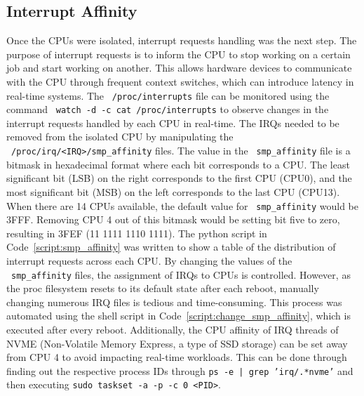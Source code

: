 \documentclass[MMR,Master,english]{twbook}
\begin{document}
\subsection{Interrupt Affinity}\label{subsec:irq_handling}
Once the CPUs were isolated, interrupt requests handling was the next step. The purpose of interrupt requests is to inform the CPU to stop working on a certain job and start working on another. This allows hardware devices to communicate with the CPU through frequent context switches, which can introduce latency in real-time systems. The ~\texttt{/proc/interrupts} file can be monitored using the command ~\texttt{watch -d -c cat /proc/interrupts} to observe changes in the interrupt requests handled by each CPU in real-time. The IRQs needed to be removed from the isolated CPU by manipulating the ~\texttt{/proc/irq/<IRQ>/smp\_affinity} files. The value in the ~\texttt{smp\_affinity} file is a bitmask in hexadecimal format where each bit corresponds to a CPU. The least significant bit (LSB) on the right corresponds to the first CPU (CPU0), and the most significant bit (MSB) on the left corresponds to the last CPU (CPU13). When there are 14 CPUs available, the default value for ~\texttt{smp\_affinity} would be 3FFF. Removing CPU 4 out of this bitmask would be setting bit five to zero, resulting in 3FEF (11 1111 1110 1111). The python script in Code~\ref{script:smp_affinity} was written to show a table of the distribution of interrupt requests across each CPU. By changing the values of the ~\texttt{smp\_affinity} files, the assignment of IRQs to CPUs is controlled. However, as the proc filesystem resets to its default state after each reboot, manually changing numerous IRQ files is tedious and time-consuming. This process was automated using the shell script in Code~\ref{script:change_smp_affinity}, which is executed after every reboot. Additionally, the CPU affinity of IRQ threads of NVME (Non-Volatile Memory Express, a type of SSD storage) can be set away from CPU 4 to avoid impacting real-time workloads. This can be done through finding out the respective process IDs through \texttt{ps -e | grep 'irq/.*nvme'} and then executing \texttt{sudo taskset -a -p -c 0 <PID>}.
\end{document}
